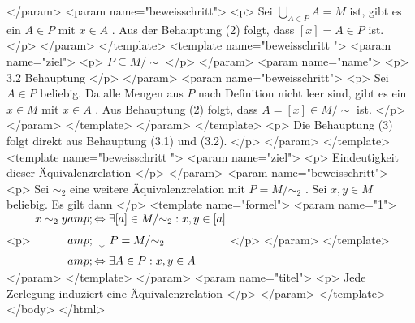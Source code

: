          </param>
         <param name="beweisschritt">
          <p>
           Sei
           $\bigcup_{A\in P} A=M$
           ist, gibt es ein
           $A\in P$
           mit
           $x\in A$
           . Aus der Behauptung (2) folgt, dass
           $[x]=A\in P$
           ist.
          </p>
         </param>
        </template>
        <template name="beweisschritt
 ">
         <param name="ziel">
          <p>
           $P \subseteq M/{\sim}$
          </p>
         </param>
         <param name="name">
          <p>
           3.2 Behauptung
          </p>
         </param>
         <param name="beweisschritt">
          <p>
           Sei
           $A\in P$
           beliebig. Da alle Mengen aus
           $P$
           nach Definition nicht leer sind, gibt es ein
           $x\in M$
           mit
           $x\in A$
           . Aus Behauptung (2) folgt, dass
           $A=[x]\in M/{\sim}$
           ist.
          </p>
         </param>
        </template>
       </param>
      </template>
      <p>
       Die Behauptung (3) folgt direkt aus Behauptung (3.1) und (3.2).
      </p>
     </param>
    </template>
    <template name="beweisschritt
 ">
     <param name="ziel">
      <p>
       Eindeutigkeit dieser Äquivalenzrelation
      </p>
     </param>
     <param name="beweisschritt">
      <p>
       Sei
       $\sim_2$
       eine weitere Äquivalenzrelation mit
       $P=M/{\sim_2}$
       . Sei
       $x,y\in M$
       beliebig. Es gilt dann
      </p>
      <template name="formel">
       <param name="1">
        <p>
         $\begin{align} x\sim_2 y &amp; \Leftrightarrow \exists [a] \in M/{\sim_2}: x,y\in [a] \\[0.3em] &amp; \ \left\downarrow\ P=M/{\sim_2}\right.\\[0.3em] &amp; \Leftrightarrow \exists A\in P: x,y\in A \end{align}$
        </p>
       </param>
      </template>
     </param>
    </template>
   </param>
   <param name="titel">
    <p>
     Jede Zerlegung induziert eine Äquivalenzrelation
    </p>
   </param>
  </template>
 </body>
</html>
